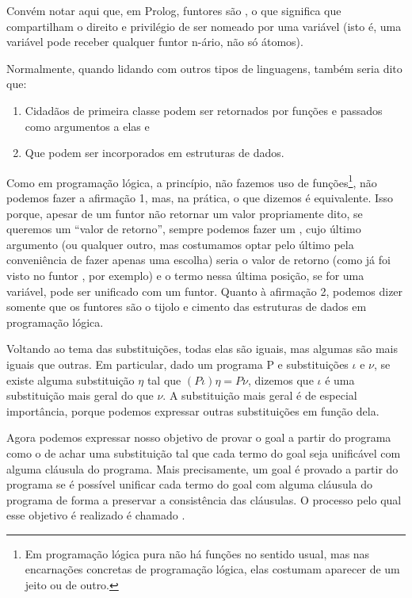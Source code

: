   Convém notar aqui que, em Prolog, funtores são , o que significa que compartilham o
  direito e privilégio de ser nomeado por uma variável (isto é, uma variável pode receber qualquer funtor n-ário, não só átomos).

  Normalmente, quando lidando com outros tipos de linguagens, também seria dito que:

  \begin{enumerate}
    \item Cidadãos de primeira classe podem ser retornados por funções e passados como argumentos a elas e
    \item Que podem ser incorporados em estruturas de dados.
  \end{enumerate}

  Como em programação lógica, a princípio, não fazemos uso de
  funções\footnote{Em programação lógica pura não há funções no sentido
    usual, mas nas encarnações concretas de programação lógica, elas
    costumam aparecer de um jeito ou de outro.}, não podemos fazer a afirmação 1, mas, na prática, o que dizemos é equivalente.
  Isso porque, apesar de um funtor  não retornar um valor
  propriamente dito, se queremos um ``valor de retorno'', sempre
  podemos fazer um , cujo último argumento (ou qualquer
  outro, mas costumamos optar pelo último pela conveniência de fazer
  apenas uma escolha) seria o valor de retorno (como já foi visto no funtor
  , por exemplo) e o termo nessa última posição, se
  for uma variável, pode ser unificado com um funtor. Quanto à
  afirmação 2, podemos dizer somente que os funtores são o tijolo e
  cimento das   estruturas de dados em programação lógica.

Voltando ao tema das substituições, todas elas são iguais, mas algumas
são mais iguais que outras. Em particular, dado um programa P e
substituições $\iota$ e $\nu$, se existe alguma substituição $\eta$
tal que $(P\iota)\eta = P \nu$, dizemos que $\iota$ é uma substituição
mais geral do que $\nu$. A substituição mais geral é de especial
importância, porque podemos expressar outras substituições em função
dela.

Agora podemos expressar nosso objetivo de provar o goal a partir do
programa como o de achar uma substituição tal que cada termo do goal
seja unificável com alguma cláusula do programa. Mais precisamente, um
goal é provado a partir do programa se é possível unificar cada termo
do goal com alguma cláusula do programa de forma a preservar a
consistência das cláusulas. O processo pelo qual esse objetivo é
realizado é chamado . 

